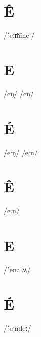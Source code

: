 \documentclass[10pt,a4paper,twoside]{book}
\begin{document}
\section*{Ê}

\begin{multicols}{3}
 {/ˈeːm͡meˑ/} {}
\end{multicols}

\section*{E}

\begin{multicols}{3}
 {/eŋ/} {}
 {/en/} {}
\end{multicols}

\section*{É}

\begin{multicols}{3}
 {/eˑŋ/} {}
 {/eˑn/} {}
\end{multicols}

\section*{Ê}

\begin{multicols}{3}
 {/eːn/} {}
\end{multicols}

\section*{E}

\begin{multicols}{3}
 {/ˈenaːʍ/} {}
\end{multicols}

\section*{É}

\begin{multicols}{3}
 {/ˈeˑndeː/} {}
\end{multicols}
\end{document}

